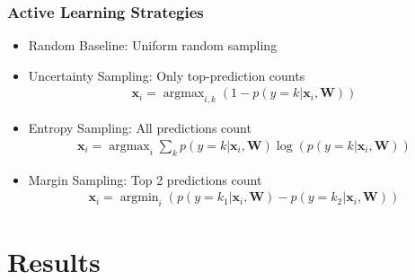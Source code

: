 \documentclass[]{beamer}
\DeclareMathOperator*{\argmax}{argmax}
\DeclareMathOperator*{\argmin}{argmin}
\renewcommand{\vec}[1]{\mathbf{#1}}
\begin{document}
\begin{frame}\frametitle{Active Learning Strategies}

\begin{itemize}
\item Random Baseline: Uniform random sampling
\item Uncertainty Sampling: Only top-prediction counts
\begin{align}\label{eq:uncertainty_sampling}
\vec{x}_i = \argmax_{i,k} \left(1- p(y=k|\vec{x}_i,\vec{W})\right)
\end{align}
\item Entropy Sampling: All predictions count
\begin{align}\label{eq:entropy_sampling}
\vec{x}_i = \argmax_{i} \sum_k p(y=k|\vec{x}_i,\vec{W}) \log(p(y=k|\vec{x}_i,\vec{W}))
\end{align}
\item Margin Sampling: Top 2 predictions count
\begin{align}\label{eq:entropy_sampling}
\vec{x}_i = \argmin_{i} \left(p(y=k_1|\vec{x}_i,\vec{W}) - p(y=k_2|\vec{x}_i,\vec{W}) \right)
\end{align}
\end{itemize}
\end{frame}




\section{Results}
\subsection{}
\end{document}
